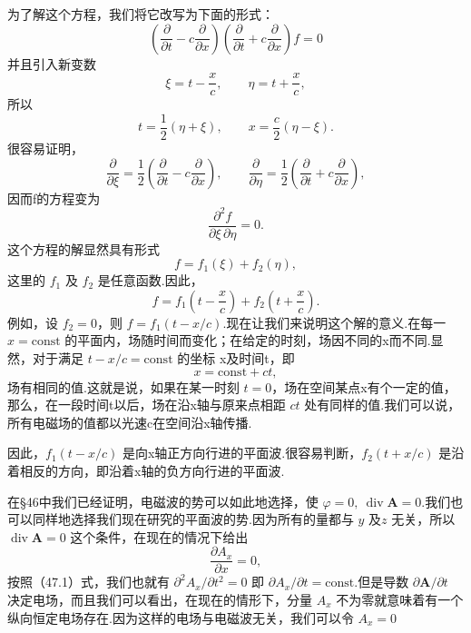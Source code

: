 为了解这个方程，我们将它改写为下面的形式：
\begin{equation*}
  \left(\frac{\partial}{\partial t}-c\frac{\partial}{\partial x}\right)
  \left(\frac{\partial}{\partial t}+c\frac{\partial}{\partial x}\right)f=0
\end{equation*}
并且引入新变数
\begin{equation*}
  \xi=t-\frac{x}{c},\qquad\eta=t+\frac{x}{c},
\end{equation*}
所以
\begin{equation*}
  t=\frac{1}{2}(\eta+\xi),\qquad x=\frac{c}{2}(\eta-\xi).
\end{equation*}
很容易证明，
\begin{equation*}
  \frac{\partial}{\partial\xi}=\frac{1}{2}\left(\frac{\partial}{\partial t}
  -c\frac{\partial}{\partial x}\right),\qquad
  \frac{\partial}{\partial\eta}=\frac{1}{2}\left(\frac{\partial}{\partial t}
  +c\frac{\partial}{\partial x}\right),
\end{equation*}
因而f的方程变为
\begin{equation*}
  \frac{\partial^2 f}{\partial\xi\,\partial\eta}=0.
\end{equation*}
这个方程的解显然具有形式
\begin{equation*}
  f=f_1(\xi)+f_2(\eta),
\end{equation*}
这里的 $f_1$ 及 $f_2$ 是任意函数.因此，
\begin{equation}
  f=f_1\left(t-\frac{x}{c}\right)+f_2\left(t+\frac{x}{c}\right).
\end{equation}
例如，设 $f_2 = 0$，则 $f = f_1(t - x/c)$.现在让我们来说明这个解的意义.在每一 $x = \mathrm{const}$ 的平面内，场随时间而变化；在给定的时刻，场因不同的x而不同.显然，对于满足 $t - x/c = \mathrm{const}$ 的坐标 x及时间t，即
\begin{equation*}
  x=\mathrm{const}+ct,
\end{equation*}
场有相同的值.这就是说，如果在某一时刻 $t = 0$，场在空间某点x有个一定的值，那么，在一段时间t以后，场在沿x轴与原来点相距 $ct$ 处有同样的值.我们可以说，所有电磁场的值都以光速c在空间沿x轴传播.

因此，$f_1(t - x/c)$ 是向x轴正方向行进的平面波.很容易判断，$f_2(t + x/c)$ 是沿着相反的方向，即沿着x轴的负方向行进的平面波.

在§46中我们已经证明，电磁波的势可以如此地选择，使 $\varphi = 0,\ \operatorname{div}\boldsymbol{A} = 0$.我们也可以同样地选择我们现在研究的平面波的势.因为所有的量都与 $y$ 及$z$ 无关，所以 $\operatorname{div}\boldsymbol{A} = 0$ 这个条件，在现在的情况下给出
\begin{equation*}
  \frac{\partial A_x}{\partial x}=0,
\end{equation*}
按照（47.1）式，我们也就有 $\partial^2 A_x/\partial t^2 = 0$ 即 $\partial A_x/\partial t = \mathrm{const}$.但是导数 $\partial\boldsymbol{A}/\partial t$ 决定电场，而且我们可以看出，在现在的情形下，分量 $A_x$ 不为零就意味着有一个纵向恒定电场存在.因为这样的电场与电磁波无关，我们可以令 $A_x = 0$

